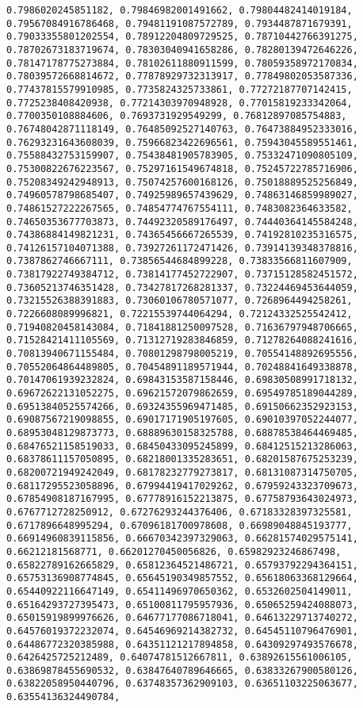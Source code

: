 \documentclass[11pt]{article}
\begin{document}
\begin{Verbatim}[commandchars=\\\{\}]
0.7986020245851182, 0.79846982001491662, 0.79804482414019184, 0.79567084916786468, 0.79481191087572789, 0.7934487871679391, 0.79033355801202554, 0.78912204809729525, 0.78710442766391275, 0.78702673183719674, 0.78303040941658286, 0.78280139472646226, 0.78147178775273884, 0.78102611880911599, 0.78059358972170834, 0.78039572668814672, 0.77878929732313917, 0.77849802053587336, 0.77437815579910985, 0.7735824325733861, 0.77272187707142415, 0.7725238408420938, 0.77214303970948928, 0.77015819233342064, 0.7700350108884606, 0.7693731929549299, 0.76812897085754883, 0.76748042871118149, 0.76485092527140763, 0.76473884952333016, 0.76293231643608039, 0.75966823422696561, 0.75943045589551461, 0.75588432753159907, 0.75438481905783905, 0.75332471090805109, 0.75300822676223567, 0.75297161549674818, 0.75245722785716906, 0.75208349242948913, 0.75074257600168126, 0.75018889525256849, 0.74960578798685407, 0.74925989657439629, 0.74863146859989027, 0.74861527222267565, 0.74854774767554111, 0.7483082364633582, 0.74650353677703873, 0.74492320589176497, 0.74440364145584248, 0.74386884149821231, 0.74365456667265539, 0.74192810235316575, 0.74126157104071388, 0.73927261172471426, 0.73914139348378816, 0.7387862746667111, 0.73856544684899228, 0.73833566811607909, 0.73817922749384712, 0.73814177452722907, 0.73715128582451572, 0.73605213746351428, 0.73427817268281337, 0.73224469453644059, 0.73215526388391883, 0.73060106780571077, 0.7268964494258261, 0.7226608089996821, 0.72215539744064294, 0.72124332525542412, 0.71940820458143084, 0.71841881250097528, 0.71636797948706665, 0.71528421411105569, 0.71312719283846859, 0.71278264088241616, 0.70813940671155484, 0.70801298798005219, 0.70554148892695556, 0.70552064864489805, 0.70454891189571944, 0.70248841649338878, 0.70147061939232824, 0.69843153587158446, 0.69830508991718132, 0.69672622131052275, 0.69621572079862659, 0.69549785189044289, 0.69513840525574266, 0.69324355969471485, 0.69150662352923153, 0.69087567219098855, 0.69017171905197605, 0.69010397052244077, 0.68953048129873773, 0.68889630158325788, 0.68878538464469485, 0.68476521158519033, 0.68450433095245899, 0.68412515213286063, 0.68378611157050895, 0.68218001335283651, 0.68201587675253239, 0.68200721949242049, 0.68178232779273817, 0.68131087314750705, 0.68117295523058896, 0.67994419417029262, 0.67959243323709673, 0.67854908187167995, 0.67778916152213875, 0.67758793643024973, 0.6767712728250912, 0.67276293244376406, 0.67183328397325581, 0.6717896648995294, 0.67096181700978608, 0.66989048845193777, 0.66914960839115856, 0.66670342397329063, 0.66281574029575141, 0.66212181568771, 0.66201270450056826, 0.65982923246867498, 0.65822789162665829, 0.65812364521486721, 0.65793792294364151, 0.65753136908774845, 0.65645190349857552, 0.65618063368129664, 0.65440922116647149, 0.65411496970650362, 0.6532602504149011, 0.65164293727395473, 0.65100811795957936, 0.65065259424088073, 0.65015919899976626, 0.64677177086718041, 0.64613229713740272, 0.64576019372232074, 0.64546969214382732, 0.64545110796476901, 0.64486772320385988, 0.64351121217894858, 0.64309297493576678, 0.6426425725212489, 0.64074781512667811, 0.63892615561006105, 0.63869878455690532, 0.63847640789646665, 0.63833267900580126, 0.63822058950440796, 0.63748357362909103, 0.63651103225063677, 0.63554136324490784, 
\end{Verbatim}
\end{document}
